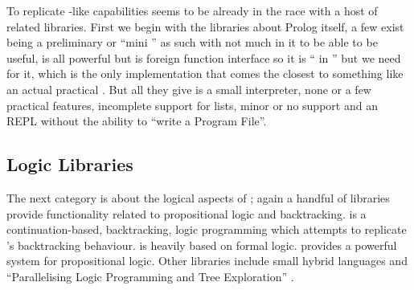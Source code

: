 \documentclass[thesis-solanki.tex]{subfiles}
\begin{document}
To replicate -like
capabilities  seems to be already in the race
with a host of related libraries.
First we begin with the libraries about Prolog
itself,
a few exist \cite{nanoprolog-lib} being a preliminary or
``mini '' as such with not much in it to be able to be useful, \cite{hswip-lib} is all powerful but is 
foreign function interface so it is `` in '' but we need  for it,
\cite{prolog-lib}\yyy{}{\Large,} which is the only implementation that comes the closest
to something like an actual practical
.
But all they give is a small interpreter, none or a few practical features, incomplete support for lists, minor or
no  support and an REPL without the ability to ``write a  Program File''.

\subsection{Logic Libraries}

The next category is about the logical aspects of ; again a handful of libraries  provide  functionality  related
  to propositional logic and backtracking.
  \cite{logict-lib} is a continuation-based, backtracking, logic programming  which attempts to replicate
  's
  backtracking behaviour.
   is heavily based on formal logic.
  \cite{proplogic-lib} provides a powerful system for propositional logic.
  Other libraries
  include small hybrid languages \cite{cflp-lib} and
  ``Parallelising Logic Programming and Tree Exploration''
  \cite{logic-grows-on-trees-lib}.
\end{document}
